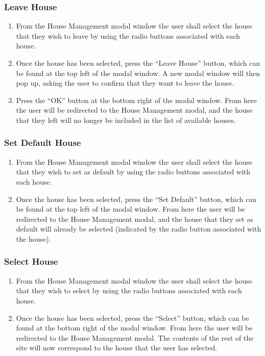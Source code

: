 \documentclass[12pt]{article}
\begin{document}
    \subsubsection{Leave House}
    \begin{enumerate}
        \item From the House Management modal window the user shall select the house that they wish to leave by using the radio buttons associated with each house.
        \item Once the house has been selected, press the ``Leave House'' button, which can be found at the top left of the modal window. A new modal window will then pop up, asking the user to confirm that they want to leave the house.
        \item Press the ``OK'' button at the bottom right of the modal window. From here the user will be redirected to the House Management modal, and the house that they left will no longer be included in the list of available houses.
    \end{enumerate}

    \subsubsection{Set Default House}
    \begin{enumerate}
        \item From the House Management modal window the user shall select the house that they wish to set as default by using the radio buttons associated with each house.
        \item Once the house has been selected, press the ``Set Default'' button, which can be found at the top left of the modal window. From here the user will be redirected to the House Management modal, and the house that they set as default will already be selected (indicated by the radio button associated with the house).
    \end{enumerate}

    \subsubsection{Select House}
    \begin{enumerate}
        \item From the House Management modal window the user shall select the house that they wish to select by using the radio buttons associated with each house.
        \item Once the house has been selected, press the ``Select'' button, which can be found at the bottom right of the modal window. From here the user will be redirected to the House Management modal. The contents of the rest of the site will now correspond to the house that the user has selected.
    \end{enumerate}
\end{document}
